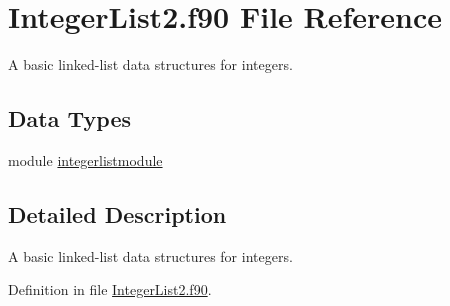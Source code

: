 \hypertarget{IntegerList2_8f90}{\section{Integer\+List2.\+f90 File Reference}
\label{IntegerList2_8f90}
}


A basic linked-\/list data structures for integers.  


\subsection*{Data Types}
\begin{DoxyCompactItemize}
\item 
module \hyperlink{classintegerlistmodule}{integerlistmodule}
\end{DoxyCompactItemize}


\subsection{Detailed Description}
A basic linked-\/list data structures for integers. 



Definition in file \hyperlink{IntegerList2_8f90_source}{Integer\+List2.\+f90}.

